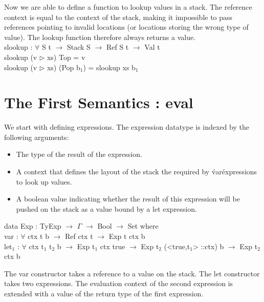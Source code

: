 \documentclass[paper=a4, fontsize=11pt]{scrartcl} %
\numberwithin{equation}{section} %
\numberwithin{figure}{section} %
\numberwithin{table}{section} %
\begin{document}
Now we are able to define a function to lookup values in a stack. The reference context is equal to the context of the stack, making it impossible to pass references pointing to invalid locations (or locations storing the wrong type of value). The lookup function therefore always returns a value.\\

\ttfamily
slookup : $\forall$ {S t} $\rightarrow$ Stack S $\rightarrow$ Ref S t $\rightarrow$ Val t\\
slookup (v $\rhd$ xs) Top = v\\
slookup (v $\rhd$ xs) (Pop b$_1$) = slookup xs b$_1$\\

\normalfont

\section{The First Semantics : eval}

We start with defining expressions. The expression datatype is indexed by the following arguments: \\

\begin{itemize}
  \item The type of the result of the expression.
  \item A context that defines the layout of the stack the required by \'var\' expressions to look up values.
  \item A boolean value indicating whether the result of this expression will be pushed on the stack as a value bound by a let expression.
\end{itemize}

\ttfamily

data Exp : TyExp $\rightarrow$ $\Gamma$ $\rightarrow$ Bool $\rightarrow$ Set where\\
  var  : $\forall$ {ctx t b} $\rightarrow$ Ref ctx t $\rightarrow$ Exp t ctx b\\
  let$_1$ : $\forall$ {ctx t$_1$ t$_2$ b} $\rightarrow$ Exp t$_1$ ctx true $\rightarrow$ Exp t$_2$ (<true,t$_1$>  ::ctx) b $\rightarrow$ Exp t$_2$ ctx b\\

\normalfont

The var constructor takes a reference to a value on the stack. The let constructor takes two expressions. The evaluation context of the second expression is extended with a value of the return type of the first expression.\\
\end{document}
